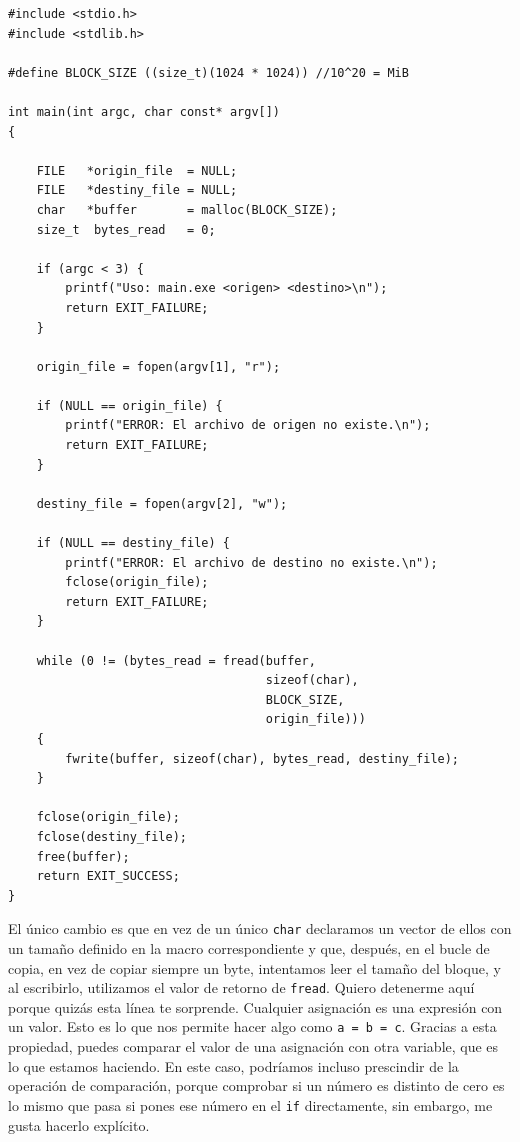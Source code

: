 \documentclass[a4paper]{article}
\begin{document}
\noindent
\begin{minipage}[H]{\linewidth}
\mbox{}
\begin{lstlisting}[style=C,
caption={Ejemplo de lectura de fichero con \textit{buffer}},
label={lst:readWithBuffer}]
#include <stdio.h>
#include <stdlib.h>

#define BLOCK_SIZE ((size_t)(1024 * 1024)) //10^20 = MiB

int main(int argc, char const* argv[])
{

    FILE   *origin_file  = NULL;
    FILE   *destiny_file = NULL;
    char   *buffer       = malloc(BLOCK_SIZE);
    size_t  bytes_read   = 0;

    if (argc < 3) {
        printf("Uso: main.exe <origen> <destino>\n");
        return EXIT_FAILURE;
    }

    origin_file = fopen(argv[1], "r");

    if (NULL == origin_file) {
        printf("ERROR: El archivo de origen no existe.\n");
        return EXIT_FAILURE;
    }

    destiny_file = fopen(argv[2], "w");

    if (NULL == destiny_file) {
        printf("ERROR: El archivo de destino no existe.\n");
        fclose(origin_file);
        return EXIT_FAILURE;
    }

    while (0 != (bytes_read = fread(buffer,
                                    sizeof(char),
                                    BLOCK_SIZE,
                                    origin_file)))
    {
        fwrite(buffer, sizeof(char), bytes_read, destiny_file);
    }

    fclose(origin_file);
    fclose(destiny_file);
    free(buffer);
    return EXIT_SUCCESS;
}

\end{lstlisting}
\end{minipage}

El único cambio es que en vez de un único \verb!char! declaramos un vector de
ellos con un tamaño definido en la macro correspondiente y que, después,
en el bucle de copia, en vez de copiar siempre un byte, intentamos leer
el tamaño del bloque, y al escribirlo, utilizamos el valor de retorno de
\verb!fread!. Quiero detenerme aquí porque quizás esta línea te sorprende.
Cualquier asignación es una expresión con un valor. Esto es lo que nos permite
hacer algo como \verb!a = b = c!. Gracias a esta propiedad, puedes comparar
el valor de una asignación con otra variable, que es lo que estamos haciendo.
En este caso, podríamos incluso prescindir de la operación de comparación,
porque comprobar si un número es distinto de cero es lo mismo que pasa si pones
ese número en el \verb!if! directamente, sin embargo, me gusta hacerlo
explícito.
\end{document}
